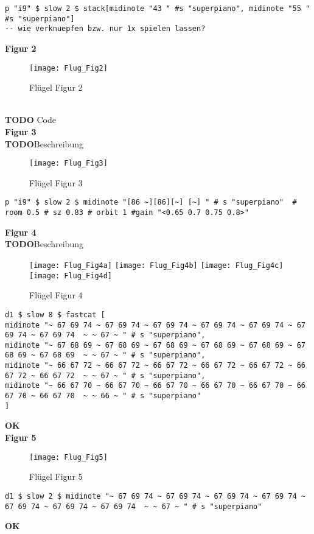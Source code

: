 \documentclass[
10pt, %
a4paper, %
oneside, %
headinclude,footinclude, %
BCOR5mm, %
]{scrartcl}
\begin{document}
\begin{lstlisting}
p "i9" $ slow 2 $ stack[midinote "43 " #s "superpiano", midinote "55 " #s "superpiano"]
-- wie verknuepfen bzw. nur 1x spielen lassen?
\end{lstlisting}

\noindent \textbf{Figur 2}\\
\begin{figure}[h]
	\centering 
	\texttt{[image: Flug\_Fig2]} 
	\caption{Flügel Figur 2}
\end{figure}\\
{\color{red}\textbf{TODO}} Code\\


\noindent \textbf{Figur 3}\\
{\color{red}\textbf{TODO}}Beschreibung\\
\begin{figure}[h]
	\centering 
	\texttt{[image: Flug\_Fig3]} 
	\caption{Flügel Figur 3}
\end{figure}
\begin{lstlisting}
p "i9" $ slow 2 $ midinote "[86 ~][86][~] [~] " # s "superpiano"  # room 0.5 # sz 0.83 # orbit 1 #gain "<0.65 0.7 0.75 0.8>"
\end{lstlisting}


\noindent \textbf{Figur 4}\\
{\color{red}\textbf{TODO}}Beschreibung\\
\begin{figure}[h]
	\centering 
	\texttt{[image: Flug\_Fig4a]} 
	\texttt{[image: Flug\_Fig4b]} 
	\texttt{[image: Flug\_Fig4c]} 
	\texttt{[image: Flug\_Fig4d]} 
	\caption{Flügel Figur 4}
\end{figure}
\begin{lstlisting}
d1 $ slow 8 $ fastcat [
midinote "~ 67 69 74 ~ 67 69 74 ~ 67 69 74 ~ 67 69 74 ~ 67 69 74 ~ 67 69 74 ~ 67 69 74  ~ ~ 67 ~ " # s "superpiano",
midinote "~ 67 68 69 ~ 67 68 69 ~ 67 68 69 ~ 67 68 69 ~ 67 68 69 ~ 67 68 69 ~ 67 68 69  ~ ~ 67 ~ " # s "superpiano",
midinote "~ 66 67 72 ~ 66 67 72 ~ 66 67 72 ~ 66 67 72 ~ 66 67 72 ~ 66 67 72 ~ 66 67 72  ~ ~ 67 ~ " # s "superpiano",
midinote "~ 66 67 70 ~ 66 67 70 ~ 66 67 70 ~ 66 67 70 ~ 66 67 70 ~ 66 67 70 ~ 66 67 70  ~ ~ 66 ~ " # s "superpiano"
]
\end{lstlisting}
{\color{green}\textbf{OK}} \\


\noindent \textbf{Figur 5}\\
\begin{figure}[h]
	\centering 
	\texttt{[image: Flug\_Fig5]} 
	\caption{Flügel Figur 5}
\end{figure}
\begin{lstlisting}
d1 $ slow 2 $ midinote "~ 67 69 74 ~ 67 69 74 ~ 67 69 74 ~ 67 69 74 ~ 67 69 74 ~ 67 69 74 ~ 67 69 74  ~ ~ 67 ~ " # s "superpiano"
\end{lstlisting}
{\color{green}\textbf{OK}} \\
\end{document}
